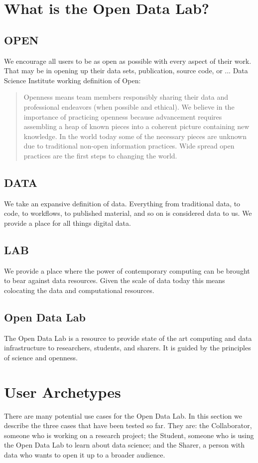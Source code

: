 \section{What is the Open Data Lab?}
\subsection*{OPEN}
We encourage all users to be as open as possible with every aspect of their work. That may be in opening up their data sets, publication, source code, or ...
Data Science Institute working definition of Open:
\begin{quote}
Openness means team members responsibly sharing their data and professional endeavors (when possible and ethical). We believe in the importance of practicing openness because advancement requires assembling a heap of known pieces into a coherent picture containing new knowledge. In the world today some of the necessary pieces are unknown due to traditional non-open information practices. Wide spread open practices are the first steps to changing the world.
\end{quote}

\subsection*{DATA}
We take an expansive definition of data. Everything from traditional data, to code, to workflows, to published material, and so on is considered data to us. We provide a place for all things digital data.
\subsection*{LAB}
We provide a place where the power of contemporary computing can be brought to bear against data resources. Given the scale of data today this means colocating the data and computational resources.
\subsection*{Open Data Lab}
The Open Data Lab is a resource to provide state of the art computing and data infrastructure to researchers, students, and sharers. It is guided by the principles of science and openness.
 
\section{User Archetypes}
\label{sec:archetypes}
There are many potential use cases for the Open Data Lab. In this section we describe the three cases that have been tested so far. They are: the Collaborator, someone who is working on a research project; the Student, someone who is using the Open Data Lab to learn about data science; and the Sharer, a person with data who wants to open it up to a broader audience.

